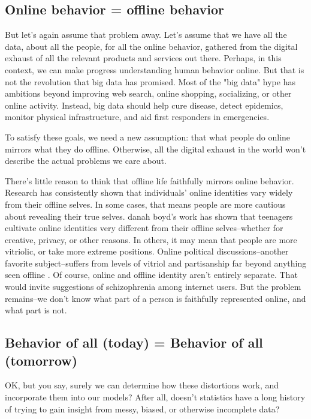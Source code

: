 \documentclass[12pt]{article}
\begin{document}
\subsection{Online behavior = offline behavior}
\label{sec:online-offline}

But let's again assume that problem away. Let's assume that we have
all the data, about all the people, for all the online behavior,
gathered from the digital exhaust of all the relevant products and
services out there. Perhaps, in this context, we can make progress
understanding human behavior online. But that is not the revolution
that big data has promised. Most of the "big data" hype has ambitions
beyond improving web search, online shopping, socializing, or other
online activity. Instead, big data should help cure disease, detect
epidemics, monitor physical infrastructure, and aid first responders
in emergencies. 

To satisfy these goals, we need a new assumption: that what
people do online mirrors what they do offline. Otherwise, all the
digital exhaust in the world won't describe the actual problems we
care about. 

There's little reason to think that offline life faithfully mirrors
online behavior. Research has consistently shown that individuals'
online identities vary widely from their offline selves. In some
cases, that means people are more cautious about revealing their true
selves. danah boyd's work \citep{boyd2011social} has shown that
teenagers cultivate online identities very different from their
offline selves--whether for creative, privacy, or other reasons. In
others, it may mean that people are more vitriolic, or take more
extreme positions. Online political discussions--another favorite
subject--suffers from levels of vitriol and partisanship far beyond
anything seen offline \citep{conover2011}. Of course, online and
offline identity aren't entirely separate. That would invite
suggestions of schizophrenia among internet users. But the problem
remains--we don't know what part of a person is faithfully represented
online, and what part is not.

\subsection{Behavior of all (today) = Behavior of all (tomorrow)}
\label{sec:behave-today-tomorrow}

OK, but you say, surely we can determine how these distortions work,
and incorporate them into our models? After all, doesn't statistics
have a long history of trying to gain insight from messy, biased, or
otherwise incomplete data?
\end{document}

